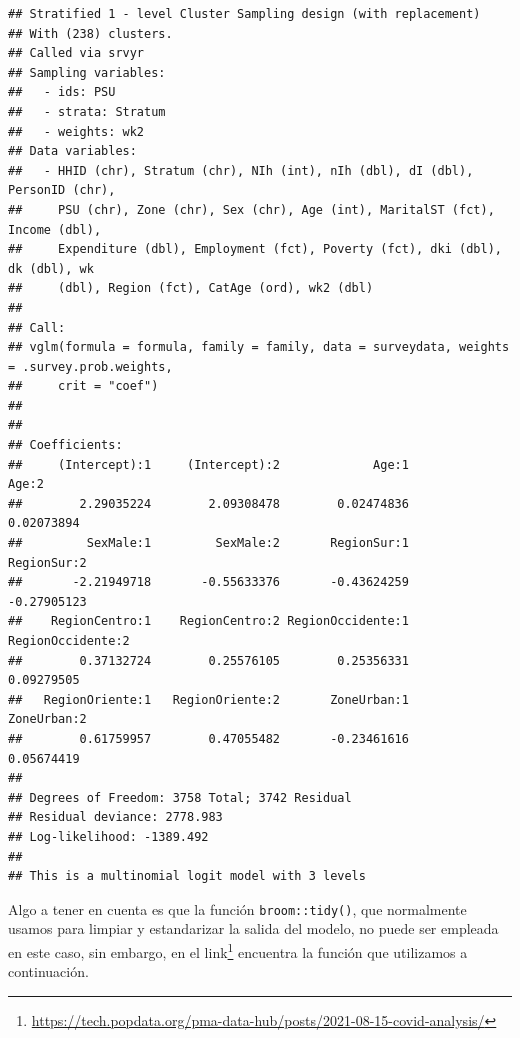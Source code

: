 \documentclass[
  spanish,
  12pt,
]{book}
\begin{document}
\begin{verbatim}
## Stratified 1 - level Cluster Sampling design (with replacement)
## With (238) clusters.
## Called via srvyr
## Sampling variables:
##   - ids: PSU 
##   - strata: Stratum 
##   - weights: wk2 
## Data variables: 
##   - HHID (chr), Stratum (chr), NIh (int), nIh (dbl), dI (dbl), PersonID (chr),
##     PSU (chr), Zone (chr), Sex (chr), Age (int), MaritalST (fct), Income (dbl),
##     Expenditure (dbl), Employment (fct), Poverty (fct), dki (dbl), dk (dbl), wk
##     (dbl), Region (fct), CatAge (ord), wk2 (dbl)
## 
## Call:
## vglm(formula = formula, family = family, data = surveydata, weights = .survey.prob.weights, 
##     crit = "coef")
## 
## 
## Coefficients:
##     (Intercept):1     (Intercept):2             Age:1             Age:2 
##        2.29035224        2.09308478        0.02474836        0.02073894 
##         SexMale:1         SexMale:2       RegionSur:1       RegionSur:2 
##       -2.21949718       -0.55633376       -0.43624259       -0.27905123 
##    RegionCentro:1    RegionCentro:2 RegionOccidente:1 RegionOccidente:2 
##        0.37132724        0.25576105        0.25356331        0.09279505 
##   RegionOriente:1   RegionOriente:2       ZoneUrban:1       ZoneUrban:2 
##        0.61759957        0.47055482       -0.23461616        0.05674419 
## 
## Degrees of Freedom: 3758 Total; 3742 Residual
## Residual deviance: 2778.983 
## Log-likelihood: -1389.492 
## 
## This is a multinomial logit model with 3 levels
\end{verbatim}

Algo a tener en cuenta es que la función \texttt{broom::tidy()}, que normalmente usamos para limpiar y estandarizar la salida del modelo, no puede ser empleada en este caso, sin embargo, en el link\footnote{\url{https://tech.popdata.org/pma-data-hub/posts/2021-08-15-covid-analysis/}} encuentra la función que utilizamos a continuación.
\end{document}
